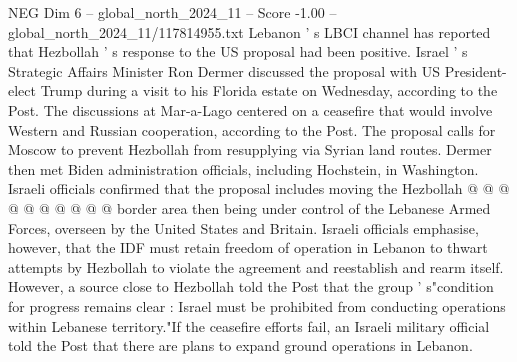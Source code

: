 \begin{textsample}{NEG Dim 6 – global\_north\_2024\_11 – Score -1.00 – global\_north\_2024\_11/117814955.txt}
Lebanon ' s LBCI channel has reported that Hezbollah ' s response to the US proposal had been positive.
Israel ' s Strategic Affairs Minister Ron Dermer discussed the proposal with US President-elect Trump during a visit to his Florida estate on Wednesday, according to the Post.
The discussions at Mar-a-Lago centered on a ceasefire that would involve Western and Russian cooperation, according to the Post.
The proposal calls for Moscow to prevent Hezbollah from resupplying via Syrian land routes.
Dermer then met Biden administration officials, including Hochstein, in Washington.
Israeli officials confirmed that the proposal includes moving the Hezbollah @ @ @ @ @ @ @ @ @ @ border area then being under control of the Lebanese Armed Forces, overseen by the United States and Britain.
Israeli officials emphasise, however, that the IDF must retain freedom of operation in Lebanon to thwart attempts by Hezbollah to violate the agreement and reestablish and rearm itself.
However, a source close to Hezbollah told the Post that the group ' s"condition for progress remains clear : Israel must be prohibited from conducting operations within Lebanese territory."If the ceasefire efforts fail, an Israeli military official told the Post that there are plans to expand ground operations in Lebanon.

\end{textsample}
